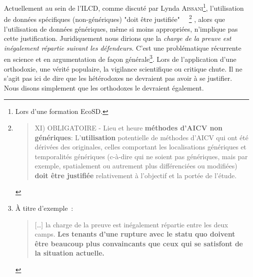 Actuellement au sein de l'ILCD, comme discuté par Lynda \textsc{Aissani}\footnote{Lors d'une formation EcoSD.}, l'utilisation de données spécifiques (non-génériques) "doit être justifiée"~\cite[Provisions: 6.7]{european_commission_ilcd_2010}
~\footnote{\blockcquote[Provisions: 6.7]{european_commission_ilcd_2010}{
XI) OBLIGATOIRE - Lieu et heure \textbf{méthodes d'AICV non génériques}: L'\textbf{utilisation} potentielle de méthodes d'AICV qui ont été dérivées des originales, celles comportant les localisations génériques et temporalités génériques (c-à-dire qui ne soient pas génériques, mais par exemple, spatialement ou autrement plus différenciées ou modifiées) \textbf{doit être justifiée} relativement à l'objectif et la portée de l'étude.
}}
, alors que l'utilisation de données génériques, même si moins appropriées, n'implique pas cette justification.
Juridiquement nous dirions que la \emph{charge de la preuve est inégalement répartie suivant les défendeurs}.
C'est une problématique récurrente en science et en argumentation de façon générale\footnote{À titre d'exemple~:
\blockcquote{deshpande_signification_2011}{
[\ldots] la charge de la preuve est inégalement répartie
entre les deux camps.
\textbf{Les tenants d’une rupture avec le statu quo doivent être beaucoup plus convaincants que ceux qui se satisfont
de la situation actuelle.}
}
}.
Lors de l'application d'une orthodoxie, une vérité populaire, la vigilance scientifique ou critique chute. %
Il ne s'agit pas ici de dire que les hétérodoxes ne devraient pas avoir à se justifier.
Nous disons simplement que les orthodoxes le devraient également.

